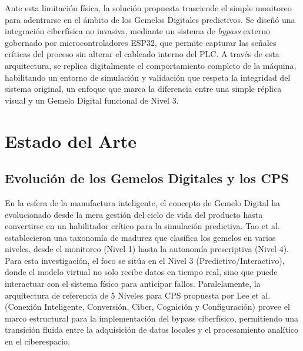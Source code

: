 Ante esta limitación física, la solución propuesta trasciende el simple monitoreo para adentrarse en el ámbito de los Gemelos Digitales predictivos. Se diseñó una integración ciberfísica no invasiva, mediante un sistema de \textit{bypass} externo gobernado por microcontroladores ESP32, que permite capturar las señales críticas del proceso sin alterar el cableado interno del PLC. A través de esta arquitectura, se replica digitalmente el comportamiento completo de la máquina, habilitando un entorno de simulación y validación que respeta la integridad del sistema original, un enfoque que marca la diferencia entre una simple réplica visual y un Gemelo Digital funcional de Nivel 3.

\section{Estado del Arte}
\subsection*{Evolución de los Gemelos Digitales y los CPS}
En la esfera de la manufactura inteligente, el concepto de Gemelo Digital ha evolucionado desde la mera gestión del ciclo de vida del producto hasta convertirse en un habilitador crítico para la simulación predictiva. Tao et al. \cite{tao2019} establecieron una taxonomía de madurez que clasifica los gemelos en varios niveles, desde el monitoreo (Nivel 1) hasta la autonomía prescriptiva (Nivel 4). Para esta investigación, el foco se sitúa en el Nivel 3 (Predictivo/Interactivo), donde el modelo virtual no solo recibe datos en tiempo real, sino que puede interactuar con el sistema físico para anticipar fallos. Paralelamente, la arquitectura de referencia de 5 Niveles para CPS propuesta por Lee et al. \cite{lee2015} (Conexión Inteligente, Conversión, Ciber, Cognición y Configuración) provee el marco estructural para la implementación del bypass ciberfísico, permitiendo una transición fluida entre la adquisición de datos locales y el procesamiento analítico en el ciberespacio.

